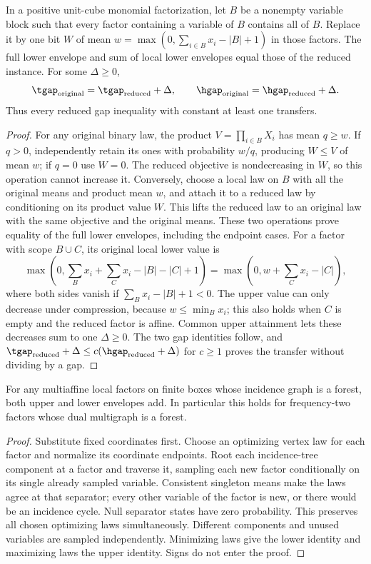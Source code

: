 \begin{lemma}\label{lem:twin-compression}
In a positive unit-cube monomial factorization, let $B$ be a nonempty
variable block such that every factor containing a variable of $B$
contains all of $B$.
Replace it by one bit $W$ of mean
$w=\max(0,\sum_{i\in B}x_i-|B|+1)$ in those factors.
The full lower envelope and sum of local lower envelopes equal those
of the reduced instance. For some $\Delta\ge0$,
\[
 \tgap_{\rm original}=\tgap_{\rm reduced}+\Delta,\qquad
 \hgap_{\rm original}=\hgap_{\rm reduced}+\Delta.
\]
Thus every reduced gap inequality with constant at least one transfers.
\end{lemma}
\begin{proof}
For any original binary law, the product $V=\prod_{i\in B}X_i$ has
mean $q\ge w$. If $q>0$, independently retain its ones with probability
$w/q$, producing $W\le V$ of mean $w$; if $q=0$ use $W=0$.
The reduced objective is nondecreasing in $W$, so this operation cannot
increase it. Conversely, choose a local law on $B$ with all the original
means and product mean $w$, and attach it to a reduced law by
conditioning on its product value $W$. This lifts the reduced law to an
original law with the same objective and the original means. These two operations prove
equality of the full lower envelopes, including the endpoint cases.
For a factor with scope $B\cup C$, its original local lower value is
\[
 \max(0,\sum_Bx_i+\sum_Cx_i-|B|-|C|+1)
 =\max(0,w+\sum_Cx_i-|C|),
\]
where both sides vanish if $\sum_Bx_i-|B|+1<0$. The upper value can
only decrease under compression, because $w\le\min_Bx_i$; this also
holds when $C$ is empty and the reduced factor is affine.
Common upper attainment lets these decreases sum to one
$\Delta\ge0$. The two gap identities follow, and
$\tgap_{\rm reduced}+\Delta\le c(\hgap_{\rm reduced}+\Delta)$ for
$c\ge1$ proves the transfer without dividing by a gap.
\end{proof}

\begin{proposition}
\label{prop:signed-forest}
For any multiaffine local factors on finite boxes whose incidence graph
is a forest, both upper and lower envelopes add. In particular this
holds for frequency-two factors whose dual multigraph is a forest.
\end{proposition}
\begin{proof}
Substitute fixed coordinates first. Choose an optimizing vertex law for
each factor and normalize its coordinate endpoints. Root each
incidence-tree component at a factor and traverse it, sampling each new
factor conditionally on its single already sampled variable. Consistent
singleton means make the laws agree at that separator; every other
variable of the factor is new, or there would be an incidence cycle.
Null separator states have zero probability. This preserves all chosen
optimizing laws simultaneously. Different components and unused variables
are sampled independently. Minimizing laws give the lower identity and
maximizing laws the upper identity. Signs do not enter the proof.
\end{proof}

